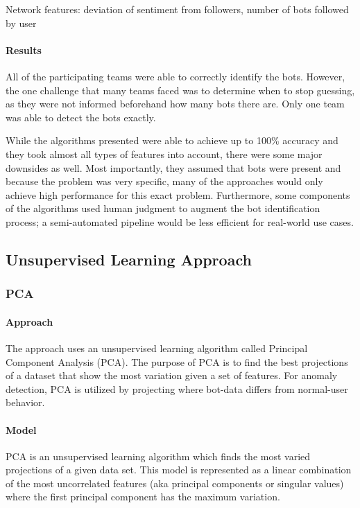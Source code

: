 \documentclass[11pt, oneside]{article}   	%
\begin{document}
Network features: deviation of sentiment from followers, number of bots followed by user

\paragraph{Results}
\quad

\quad All of the participating teams were able to correctly identify the bots.
However, the one challenge that many teams faced was to determine when to stop guessing, as they were not informed beforehand how many bots there are.
Only one team was able to detect the bots exactly.

\quad While the algorithms presented were able to achieve up to 100\% accuracy and they took almost all types of features into account, there were some major downsides as well.
Most importantly, they assumed that bots were present and because the problem was very specific, many of the approaches would only achieve high performance for this exact problem.
Furthermore, some components of the algorithms used human judgment to augment the bot identification process; a semi-automated pipeline would be less efficient for real-world use cases.

\subsection{Unsupervised Learning Approach}
\subsubsection{PCA }

\paragraph{Approach}
\quad

\quad The \cite{pca} approach uses an unsupervised learning algorithm called Principal Component Analysis (PCA).
The purpose of PCA is to find the best projections of a dataset that show the most variation given a set of features.
For anomaly detection, PCA is utilized by projecting where bot-data differs from normal-user behavior.

\paragraph{Model}
\quad

\quad PCA is an unsupervised learning algorithm which finds the most varied projections of a given data set.
This model is represented as a linear combination of the most uncorrelated features (aka principal components or singular values) where the first principal component has the maximum variation.
\end{document}
